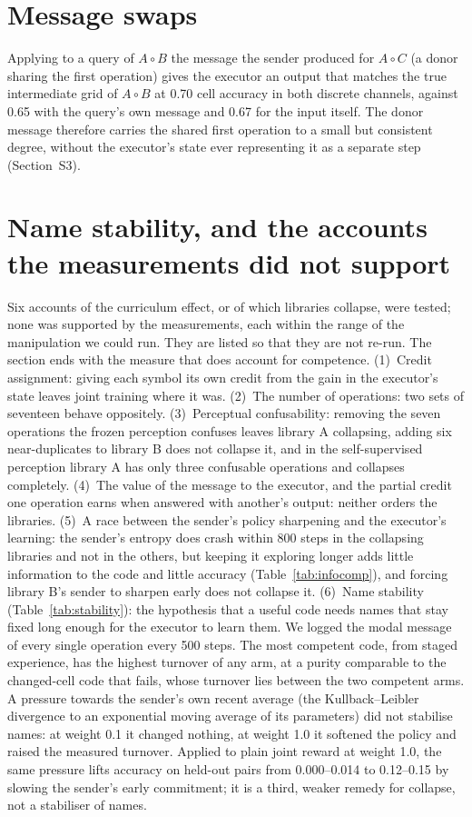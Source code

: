 \documentclass[11pt]{article}
\begin{document}
\section{Message swaps}
Applying to a query of $A\!\circ\!B$ the message the sender produced for $A\!\circ\!C$ (a donor sharing
the first operation) gives the executor an output that matches the true intermediate grid of
$A\!\circ\!B$ at 0.70 cell accuracy in both discrete channels, against 0.65 with the query's own
message and 0.67 for the input itself. The donor message therefore carries the shared first operation
to a small but consistent degree, without the executor's state ever representing it as a separate
step (Section~S3).


\section{Name stability, and the accounts the measurements did not support}\label{s:falsified}
Six accounts of the curriculum effect, or of which libraries collapse, were tested; none was supported by the
measurements, each within the range of the manipulation we could run. They are listed so that they are not
re-run. The section ends with the measure that does account for competence.
(1)~Credit assignment: giving each symbol its own credit from the gain in the executor's state leaves joint
training where it was.
(2)~The number of operations: two sets of seventeen behave oppositely.
(3)~Perceptual confusability: removing the seven operations the frozen perception confuses leaves library A
collapsing, adding six near-duplicates to library B does not collapse it, and in the self-supervised
perception library A has only three confusable operations and collapses completely.
(4)~The value of the message to the executor, and the partial credit one operation earns when answered with
another's output: neither orders the libraries.
(5)~A race between the sender's policy sharpening and the executor's learning: the sender's entropy does
crash within 800 steps in the collapsing libraries and not in the others, but keeping it exploring longer adds
little information to the code and little accuracy (Table~\ref{tab:infocomp}), and forcing library B's sender to
sharpen early does not collapse it.
(6)~Name stability (Table~\ref{tab:stability}): the hypothesis that a useful code needs names that stay fixed
long enough for the executor to learn them. We logged the modal message of every single operation every 500
steps. The most competent code, from staged experience, has the highest turnover of any arm, at a purity
comparable to the changed-cell code that fails, whose turnover lies between the two competent arms. A pressure
towards the sender's own recent average (the Kullback--Leibler divergence to an exponential moving average of
its parameters) did not stabilise names: at weight 0.1 it changed nothing, at weight 1.0 it softened the policy
and raised the measured turnover. Applied to plain joint reward at weight 1.0, the same pressure lifts accuracy on
held-out pairs from 0.000--0.014 to 0.12--0.15 by slowing the sender's early commitment; it is a third, weaker
remedy for collapse, not a stabiliser of names.
\end{document}
